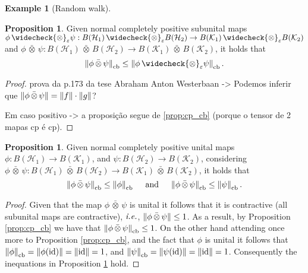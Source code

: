 \documentclass[10pt,a4paper]{amsart}
\theoremstyle{definition}
\theoremstyle{definition}
\newtheorem{example}[definition]{Example}
\theoremstyle{definition}
\theoremstyle{definition}
\newtheorem{proposition}[definition]{Proposition}
\theoremstyle{definition}
\theoremstyle{definition}
\begin{document}
\begin{example}[Random walk]

\begin{proposition} \label{prop:cb_tensores}
  Given normal completely positive subunital maps $ \phi \,\widecheck{\otimes}_\varepsilon \psi: B(\mathcal{H}_1) \,\widecheck{\otimes}_\varepsilon B(\mathcal{H}_2)  \to  B(\mathcal{K}_1) \,\widecheck{\otimes}_\varepsilon B(\mathcal{K}_2)$ 
  and $ \phi \, \bar{\otimes} \, \psi: B(\mathcal{H}_1) \, \bar{\otimes} \, B(\mathcal{H}_2)  \to  B(\mathcal{K}_1) \, \bar{\otimes} \, B(\mathcal{K}_2)$, it holds that
  \[
  \cbnorm{\phi \,\bar{\otimes} \, \psi} \leq \cbnorm{\phi \,\widecheck{\otimes}_\varepsilon \psi} .
\]
\end{proposition}

\begin{proof}
  prova da p.173 da tese Abraham Anton Westerbaan -> Podemos inferir que $\left\lVert \phi \, \bar{\otimes} \, \psi \right\rVert =  \left\lVert f \right\rVert \cdot \left\lVert g \right\rVert $?
  
  Em caso positivo -> a proposição segue de \ref{prop:cp_cb} (porque o tensor de 2 mapas cp é cp).

\end{proof}




\begin{proposition} \label{prop:cb_unital_case}
  Given  normal completely positive unital maps $\phi:B(\mathcal{H}_1) \to B(\mathcal{K}_1)  $, and $\psi:B(\mathcal{H}_2) \to B(\mathcal{K}_2)$, considering $ \phi \, \bar{\otimes} \, \psi: B(\mathcal{H}_1) \, \bar{\otimes} \, B(\mathcal{H}_2)  \to  B(\mathcal{K}_1) \, \bar{\otimes} \, B(\mathcal{K}_2)$, it holds that
  \[
  \left\lVert \phi \,\bar{\otimes} \, \psi \right\rVert_{\text{cb}} \leq \left\lVert \phi \right\rVert_{\text{cb}} \quad \text{ and } \quad \left\lVert \phi \,\bar{\otimes} \, \psi \right\rVert_{\text{cb}} \leq \left\lVert \psi \right\rVert_{\text{cb}} .
\]

\end{proposition}

\begin{proof}
  Given that the map $\phi \, \bar{\otimes} \, \psi$ is unital  it follows that it is contractive (all subunital maps are contractive), $\emph{i.e.}$, $\left\lVert \phi \, \bar{\otimes} \, \psi \right\rVert \leq 1$.
  As a result, by Proposition \ref{prop:cp_cb} we have that $\left\lVert \phi \, \bar{\otimes} \, \psi \right\rVert_{\text{cb}} \leq 1$.
  On the other hand attending once more to Proposition \ref{prop:cp_cb}, and the fact that $\phi$ is unital it follows that $\left\lVert \phi \right\rVert_{\text{cb}}=\left\lVert \phi (\mathrm{id}) \right\rVert  = \left\lVert \mathrm{id} \right\rVert = 1$, and $\left\lVert \psi \right\rVert_{\text{cb}}=\left\lVert \psi (\mathrm{id}) \right\rVert  = \left\lVert \mathrm{id} \right\rVert = 1$. Consequently the inequations in Proposition \ref{prop:cb_unital_case} hold.
\end{proof}






\end{example}
\end{document}
